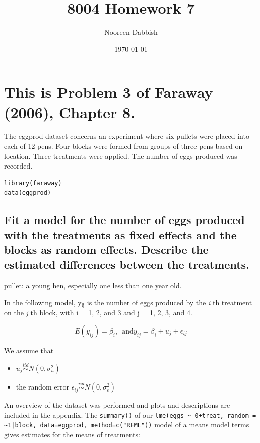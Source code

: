 \documentclass[11pt]{article}
\title{8004 Homework 7}
\author{Nooreen Dabbish}
\date{\today}
\begin{document}
\maketitle




\section{This is Problem 3 of Faraway (2006), Chapter 8.}
\label{sec-1}

The eggprod dataset concerns an experiment where six pullets were placed into each of 12 pens.
Four blocks were formed from groups of three pens based on location. Three treatments were
applied. The number of eggs produced was recorded.


\begin{verbatim}
library(faraway)
data(eggprod)
\end{verbatim}
\subsection{Fit a model for the number of eggs produced with the treatments as fixed effects and the blocks as random effects. Describe the estimated differences between the treatments.}
\label{sec-1-1}



pullet: a young hen, especially one less than one year old.

In the following model, y$_{\mathrm{ij}}$ is the number of eggs produced by the
\emph{i} th treatment on the \emph{j} th block, with i = 1, 2, and 3 and j = 1,
2, 3, and 4.

$$E(y_{ij}) = \beta_i,\,\text{ and
}y_{ij}=\beta_i+u_{j}+\epsilon_{ij}$$

We assume that 
\begin{itemize}
\item $u_{j}\overset{iid}\sim N(0,\sigma^2_u)$
\item the random error $\epsilon_{ij}\overset{iid}\sim
   N(0,\sigma^2_\epsilon)$
\end{itemize}


 



An overview of the dataset was performed and plots and descriptions are included in the
appendix. The \verb~summary()~ of our \verb.lme(eggs ~ 0+treat, random = ~1|block, data=eggprod, method=c("REML")). model of a means model terms gives
estimates for the means of treatments:
\end{document}
